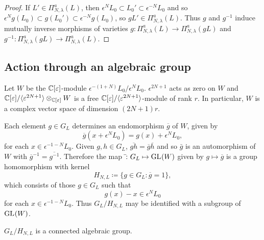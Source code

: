 \documentclass[a4paper, 11pt]{report}
\begin{document}
\begin{proof}
If $L'\in\Pi_{N,\lambda}^a(L)$, then $\epsilon^N L_0\subset L_0'\subset \epsilon^{-N}L_0$ and so $\epsilon^N g(L_0)\subset g(L_0')\subset \epsilon^{-N}g(L_0)$, so $gL'\in\Pi_{N,\lambda}^a(L)$. Thus $g$ and $g^{-1}$ induce mutually inverse morphisms of varieties $g\colon\Pi_{N,\lambda}^a(L)\to\Pi_{N,\lambda}^a(gL)$ and $g^{-1}\colon\Pi_{N,\lambda}^a(gL)\to\Pi_{N,\lambda}^a(L)$.
\end{proof}

\subsection{Action through an algebraic group}

Let $W$ be the $\mathbb{C}[\varepsilon]$-module $\epsilon^{-(1+N)}L_0/{\epsilon^{N}L_0}$. $\epsilon^{2N+1}$ acts as zero on $W$ and $\mathbb{C}[\varepsilon]/{\langle\varepsilon^{2N+1}\rangle}\otimes_{\mathbb{C}[\varepsilon]}W$ is a free $\mathbb{C}[\varepsilon]/{\langle\varepsilon^{2N+1}\rangle}$-module of rank $r$. In particular, $W$ is a complex vector space of dimension $(2N+1)r$.

Each element $g\in G_L$ determines an endomorphism $\overline{g}$ of $W$, given by
\begin{equation*}
\overline{g}(x+\epsilon^N L_0) = g(x) + \epsilon^N L_0,
\end{equation*}
for each $x\in\epsilon^{-1-N}L_0$. Given $g,h\in G_L$, $\overline{gh}=\overline{g}\overline{h}$ and so $\bar{g}$ is an automorphism of $W$ with $\overline{g}^{-1} = \overline{g^{-1}}$. Therefore the map $\bar{}\colon G_L\mapsto\operatorname{GL}_{}(W)$ given by $g\mapsto \overline{g}$ is a group homomorphism with kernel
\begin{equation*}
H_{N,L}\coloneqq \{g\in G_L:\overline{g}=1\},
\end{equation*}
which consists of those $g\in G_L$ such that
\begin{equation*}
g(x) - x\in \epsilon^N L_0
\end{equation*}
for each $x\in\epsilon^{-1-N}L_0$. Thus $G_L/{H_{N,L}}$ may be identified with a subgroup of $\operatorname{GL}_{}(W)$.

\begin{lemma}\label{lemma:connected-algebraic-group}
$G_L/{H_{N,L}}$ is a connected algebraic group.
\end{lemma}
\end{document}

